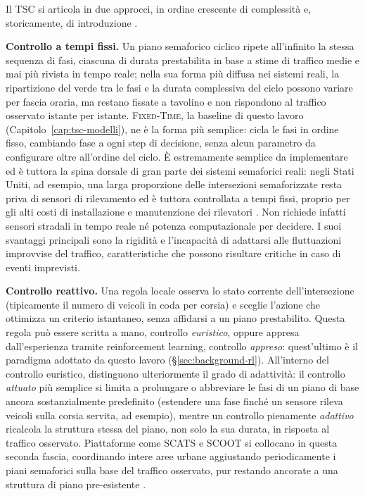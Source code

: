 Il TSC si articola in due approcci, in ordine crescente di complessità e,
storicamente, di introduzione \citep{shams2018atsctaxonomy}.

\textbf{Controllo a tempi fissi.} Un piano semaforico ciclico ripete
all'infinito la stessa sequenza di fasi, ciascuna di durata prestabilita
in base a stime di traffico medie e mai più rivista in tempo reale; nella
sua forma più diffusa nei sistemi reali, la ripartizione del verde tra le
fasi e la durata complessiva del ciclo possono variare per fascia
oraria, ma restano fissate a tavolino e non rispondono al traffico
osservato istante per istante. \textsc{Fixed-Time}, la baseline di questo
lavoro (Capitolo~\ref{cap:tsc-modelli}), ne è la forma più semplice:
cicla le fasi in ordine fisso, cambiando fase a ogni step di decisione,
senza alcun parametro da configurare oltre all'ordine del ciclo. È
estremamente semplice da implementare ed è tuttora la spina dorsale di
gran parte dei sistemi semaforici reali: negli Stati Uniti, ad esempio, una
larga proporzione delle intersezioni semaforizzate resta priva di sensori
di rilevamento ed è tuttora controllata a tempi fissi, proprio per gli
alti costi di installazione e manutenzione dei rilevatori
\citep{wang2024fixedtime}. Non richiede infatti sensori
stradali in tempo reale né potenza computazionale per decidere. I suoi
svantaggi principali sono la rigidità e l'incapacità di adattarsi alle
fluttuazioni improvvise del traffico, caratteristiche che possono
risultare critiche in caso di eventi imprevisti.

\textbf{Controllo reattivo.} Una regola locale osserva lo stato corrente
dell'intersezione (tipicamente il numero di veicoli in coda per corsia) e
sceglie l'azione che ottimizza un criterio istantaneo, senza affidarsi a
un piano prestabilito. Questa regola può essere scritta a mano, controllo
\emph{euristico}, oppure appresa dall'esperienza tramite reinforcement
learning, controllo \emph{appreso}: quest'ultimo è il paradigma adottato
da questo lavoro (§\ref{sec:background-rl}). All'interno del controllo
euristico, \citet{shams2018atsctaxonomy} distinguono ulteriormente il grado di
adattività: il controllo \emph{attuato} più semplice si limita a
prolungare o abbreviare le fasi di un piano di base ancora sostanzialmente
predefinito (estendere una fase finché un sensore rileva veicoli sulla
corsia servita, ad esempio), mentre un controllo pienamente
\emph{adattivo} ricalcola la struttura stessa del piano, non solo la sua
durata, in risposta al traffico osservato. Piattaforme come SCATS e SCOOT
si collocano in questa seconda fascia, coordinando intere aree urbane
aggiustando periodicamente i piani semaforici sulla base del traffico
osservato, pur restando ancorate a una struttura di piano pre-esistente
\citep{wei2020tscsurvey}.

